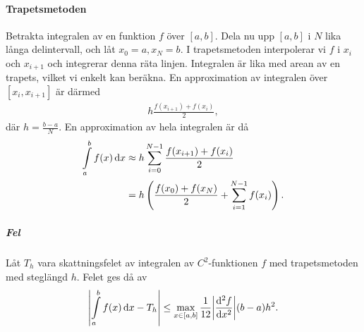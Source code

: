 \paragraph{Trapetsmetoden}
Betrakta integralen av en funktion $f$ över $[a, b]$. Dela nu upp $[a, b]$ i $N$ lika långa delintervall, och låt $x_{0} = a, x_{N} = b$. I trapetsmetoden interpolerar vi $f$ i $x_{i}$ och $x_{i + 1}$ och integrerar denna räta linjen. Integralen är lika med arean av en trapets, vilket vi enkelt kan beräkna. En approximation av integralen över $[x_{i}, x_{i + 1}]$ är därmed
\begin{align*}
	h\frac{f(x_{i + 1}) + f(x_{i})}{2},
\end{align*}
där $h = \frac{b - a}{N}$. En approximation av hela integralen är då
\begin{align*}
	\int\limits_{a}^{b}f(x)\dd{x} &\approx h\sum\limits_{i = 0}^{N - 1}\frac{f(x_{i + 1}) + f(x_{i})}{2} \\
	                        &= h\left(\frac{f(x_{0}) + f(x_{N})}{2} + \sum\limits_{i = 1}^{N - 1}f(x_{i})\right).
\end{align*}

\subparagraph{Fel}
Låt $T_{h}$ vara skattningsfelet av integralen av $C^{2}$-funktionen $f$ med trapetsmetoden med steglängd $h$. Felet ges då av
\begin{align*}
	\abs{\int\limits_{a}^{b}f(x)\dd{x} - T_{h}} \leq \max\limits_{x\in [a, b]}\frac{1}{12}\abs{\dv[2]{f}{x} (x)}(b - a)h^{2}.
\end{align*}

